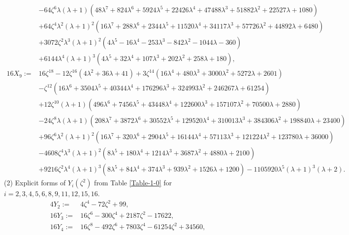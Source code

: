 \documentclass[11pt,a4paper]{article}
\numberwithin{equation}{section}
\begin{document}
{\begin{appendices}
\begin{align*}
&-64 \zeta ^6 \lambda  (\lambda +1) \left(48 \lambda ^7+824 \lambda ^6+5924 \lambda ^5+22426 \lambda ^4+47488 \lambda ^3+51882 \lambda ^2+22527 \lambda +1080\right)\\
&+64 \zeta ^4 \lambda ^2 (\lambda +1)^2 \left(16 \lambda ^7+288 \lambda ^6+2344 \lambda ^5+11520 \lambda ^4+34117 \lambda ^3+57726 \lambda ^2+44892 \lambda +6480\right)\\
&+3072 \zeta ^2 \lambda ^3 (\lambda +1)^2 \left(4 \lambda ^5-16 \lambda ^4-253 \lambda ^3-842 \lambda ^2-1044 \lambda -360\right)\\
&+6144 \lambda ^4 (\lambda +1)^3 \left(4 \lambda ^5+32 \lambda ^4+107 \lambda ^3+202 \lambda ^2+258 \lambda +180\right),\\
16X_{9}:=&16 \zeta ^{18}-12 \zeta ^{16} \left(4 \lambda ^2+36 \lambda +41\right)+3 \zeta ^{14} \left(16 \lambda ^4+480 \lambda ^3+3000 \lambda ^2+5272 \lambda +2601\right)\\
&-\zeta ^{12} \left(16 \lambda ^6+3504 \lambda ^5+40344 \lambda ^4+176296 \lambda ^3+324993 \lambda ^2+246267 \lambda +61254\right)\\
&+12 \zeta ^{10} (\lambda +1) \left(496 \lambda ^6+7456 \lambda ^5+43448 \lambda ^4+122600 \lambda ^3+157107 \lambda ^2+70500 \lambda +2880\right)\\
&-24 \zeta ^8 \lambda  (\lambda +1) \left(208 \lambda ^7+3872 \lambda ^6+30552 \lambda ^5+129520 \lambda ^4+310013 \lambda ^3+384306 \lambda ^2+198840 \lambda +23400\right)\\
&+96 \zeta ^6 \lambda ^2 (\lambda +1)^2 \left(16 \lambda ^7+320 \lambda ^6+2904 \lambda ^5+16144 \lambda ^4+57113 \lambda ^3+121224 \lambda ^2+123780 \lambda +36000\right)\\
&-4608 \zeta ^4 \lambda ^3 (\lambda +1)^2 \left(8 \lambda ^5+180 \lambda ^4+1214 \lambda ^3+3687 \lambda ^2+4880 \lambda +2100\right)\\
&+9216 \zeta ^2 \lambda ^4 (\lambda +1)^3 \left(8 \lambda ^5+84 \lambda ^4+374 \lambda ^3+939 \lambda ^2+1526 \lambda +1200\right)-1105920 \lambda ^5 (\lambda +1)^3 (\lambda +2).
\end{align*}
(2) Explicit forms of $Y_{i}(\zeta^2)$ from Table \ref{Table-1-0} for $i=2,3,4,5,6,8,9,11,12,15,16$.
\begin{align*}
4Y_{2}:=&4 \zeta ^4-72 \zeta ^2+99,\\
16Y_{3}:=&16 \zeta ^6-300 \zeta ^4+2187 \zeta ^2-17622,\\
16Y_{4}:=&16 \zeta ^8-492 \zeta ^6+7803 \zeta ^4-61254 \zeta ^2+34560,\\

\end{align*}
\end{appendices}}
\end{document}
